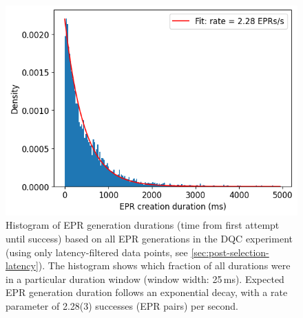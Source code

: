 \begin{figure}
\centering
\includegraphics[width=\linewidth]{figures/qnodeos/supplementary/plots/EPR_rate.png}
\caption{Histogram of \ac{EPR} generation durations (time from first attempt until success) based on all \ac{EPR} generations in the \ac{DQC} experiment (using only latency-filtered data points, see \cref{sec:post-selection-latency}). The histogram shows which fraction of all durations were in a particular duration window (window width: 25\,ms). Expected \ac{EPR} generation duration follows an exponential decay, with a rate parameter of 2.28(3) successes (\ac{EPR} pairs) per second.}
\label{fig:delcomp-epr-rate}
\end{figure}

